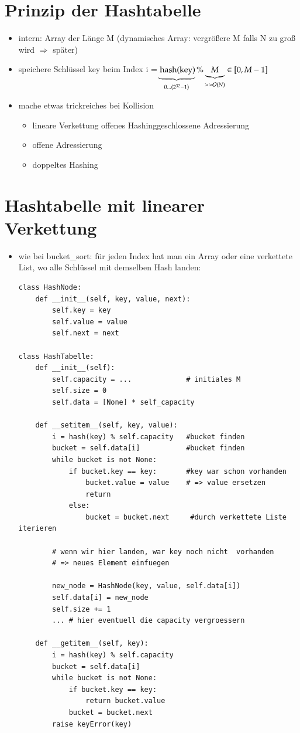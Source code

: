 \section{Prinzip der Hashtabelle}
\begin{itemize}
    \item intern: Array der Länge M (dynamisches Array: vergrößere M falls N zu groß wird $\Rightarrow$ später)
    \item speichere Schlüssel key beim Index i =$\underbrace{\text{ hash(key)}}_{0...(2^{32}-1)} \% \underbrace{M}_{>> \mathcal{O}{}(N)} \in [0, M-1]$
    \item mache etwas trickreiches bei Kollision
    \begin{itemize}
        \item lineare Verkettung \hspace*{5mm} \glqq offenes Hashing\grqq \glqq geschlossene Adressierung\grqq
        \item offene Adressierung
        \item doppeltes Hashing
    \end{itemize}
\end{itemize}

\section{Hashtabelle mit linearer Verkettung}
\begin{itemize}
    \item wie bei bucket\_sort: für jeden Index hat man ein Array oder eine verkettete List, wo alle Schlüssel mit demselben Hash landen:
    \begin{verbatim}
class HashNode:
    def __init__(self, key, value, next):
        self.key = key
        self.value = value
        self.next = next

class HashTabelle:
    def __init__(self):
        self.capacity = ...             # initiales M
        self.size = 0
        self.data = [None] * self_capacity

    def __setitem__(self, key, value):
        i = hash(key) % self.capacity   #bucket finden
        bucket = self.data[i]           #bucket finden
        while bucket is not None:
            if bucket.key == key:       #key war schon vorhanden
                bucket.value = value    # => value ersetzen
                return
            else:
                bucket = bucket.next     #durch verkettete Liste iterieren

        # wenn wir hier landen, war key noch nicht  vorhanden
        # => neues Element einfuegen

        new_node = HashNode(key, value, self.data[i])
        self.data[i] = new_node
        self.size += 1
        ... # hier eventuell die capacity vergroessern

    def __getitem__(self, key):
        i = hash(key) % self.capacity
        bucket = self.data[i]
        while bucket is not None:
            if bucket.key == key:
                return bucket.value
            bucket = bucket.next
        raise keyError(key)
    \end{verbatim}
\end{itemize}

